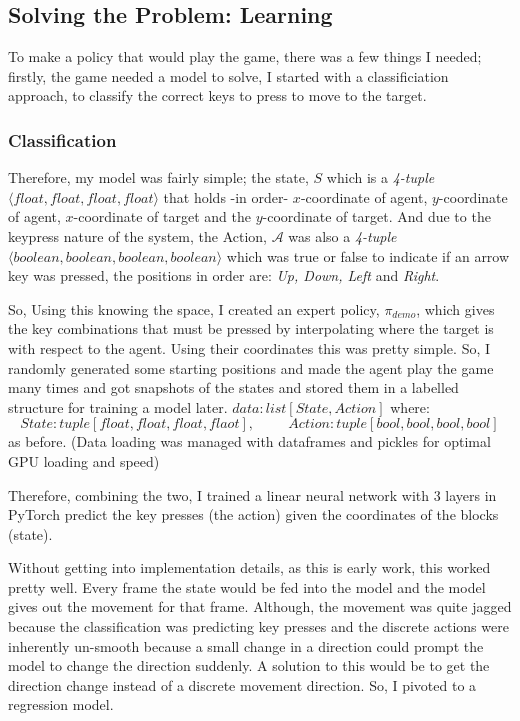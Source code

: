\subsection{Solving the Problem: Learning}
To make a policy that would play the game, there was a few things I needed; firstly, the game needed a model to solve, I started with a classificiation approach, to classify the correct keys to press to move to the target.


\subsubsection{Classification}
Therefore, my model was fairly simple; the state, $S$ which is a \emph{4-tuple} $\langle float, float, float, float \rangle$ that holds -in order- $x$-coordinate of agent, $y$-coordinate of agent, $x$-coordinate of target and the $y$-coordinate of target. And due to the keypress nature of the system, the Action, $\mathcal{A}$ was also a \emph{4-tuple} $\langle boolean, boolean, boolean, boolean \rangle$ which was true or false to indicate if an arrow key was pressed, the positions in order are: \emph{Up, Down, Left} and \emph{Right}.

So, Using this knowing the space, I created an expert policy, \(\pi_{demo}\), which gives the key combinations that must be pressed by interpolating where the target is with respect to the agent. Using their coordinates this was pretty simple. So, I randomly generated some starting positions and made the agent play the game many times and got snapshots of the states and stored them in a labelled structure for training a model later. \(data: list\left[State, Action\right]\) where:
\[
  State: tuple\left[float, float, float, flaot\right], 
  \hspace{1cm} Action: tuple\left[bool, bool, bool, bool\right]
\]
as before. (Data loading was managed with dataframes and pickles for optimal GPU loading and speed)

Therefore, combining the two, I trained a linear neural network with 3 layers in PyTorch \cite{pytorch} predict the key presses (the action) given the coordinates of the blocks (state).

Without getting into implementation details, as this is early work, this worked pretty well. Every frame the state would be fed into the model and the model gives out the movement for that frame. Although, the movement was quite jagged because the classification was predicting key presses and the discrete actions were inherently un-smooth because a small change in a direction could prompt the model to change the  direction suddenly. A solution to this would be to get the direction change instead of a discrete movement direction. So, I pivoted to a regression model.

